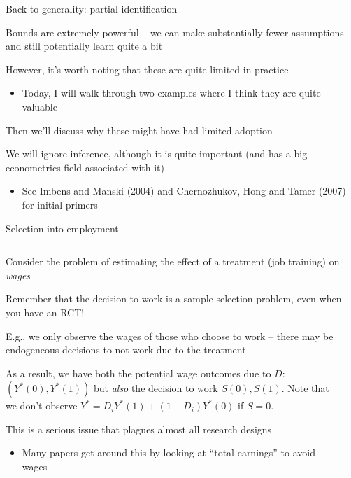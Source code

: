 \documentclass[notes,11pt, aspectratio=169]{beamer}
\newenvironment{wideitemize}{\itemize\addtolength{\itemsep}{10pt}}{\enditemize}
\begin{document}
\begin{frame}{Back to generality: partial identification}
  \begin{wideitemize}
  \item Bounds are extremely powerful -- we can make substantially
    fewer assumptions and still potentially learn quite a bit
  \item However, it's worth noting that these are quite limited in practice
    \begin{itemize}
    \item Today, I will walk through two examples where I think they are quite valuable
    \end{itemize}
  \item Then we'll discuss why these might have had limited adoption
  \item We will ignore inference, although it is quite important (and
    has a big econometrics field associated with it)
    \begin{itemize}
    \item See Imbens and Manski (2004) and Chernozhukov, Hong and Tamer (2007) for initial primers
    \end{itemize}
  \end{wideitemize}
\end{frame}

\begin{frame}{Selection into employment}
      \begin{columns}[onlytextwidth, T] %
        \begin{column}{.9\textwidth}
          \begin{wideitemize}
          \item Consider the problem of estimating the effect of a
            treatment (job training) on \emph{wages}
          \item Remember that the decision to work is a sample
            selection problem, even when you have an RCT!
          \item E.g., we only observe the wages of those who choose to
            work -- there may be endogeneous decisions to not work due
            to the treatment
          \item As a result, we have both the potential wage outcomes
            due to $D$: $(Y^{*}(0), Y^{*}(1))$ but \emph{also} the
            decision to work $S(0), S(1)$. Note that we don't observe
            $Y^{*} = D_{i}Y^{*}(1) + (1-D_{i})Y^{*}(0)$ if $S = 0$.
          \item This is a serious issue that plagues almost all
            research designs
            \begin{itemize}
            \item Many papers get around this by looking at ``total
              earnings'' to avoid wages
            \end{itemize}
          \end{wideitemize}
      \end{column}%
      \hfill%
      \begin{column}{.5\textwidth}
      \end{column}%
    \end{columns}
\end{frame}
\end{document}
